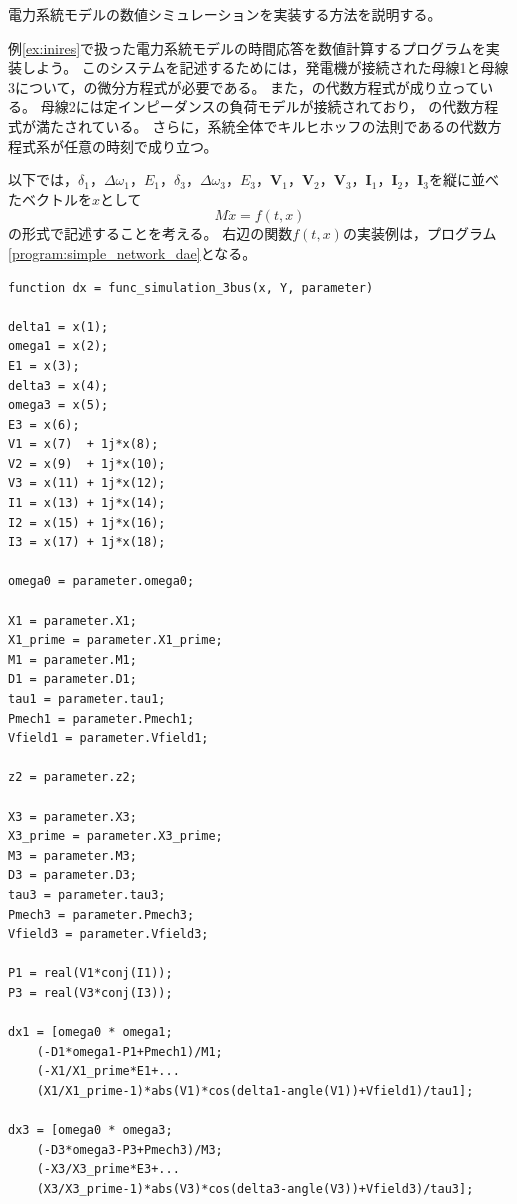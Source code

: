 \documentclass[tombow,dvipdfmx]{corona-a5-1.1}
\begin{document}
電力系統モデルの数値シミュレーションを実装する方法を説明する。

\begin{例}[電力系統のシミュレーションの単純な実装]\label{ex:dae_ex2}
例\ref{ex:inires}で扱った電力系統モデルの時間応答を数値計算するプログラムを実装しよう。
このシステムを記述するためには，発電機が接続された母線1と母線3について，の微分方程式が必要である。
また，の代数方程式が成り立っている。
母線2には定インピーダンスの負荷モデルが接続されており，
の代数方程式が満たされている。
さらに，系統全体でキルヒホッフの法則であるの代数方程式系が任意の時刻で成り立つ。

以下では，$\delta_1$，$\Delta\omega_1$，$E_1$，$\delta_3$，$\Delta\omega_3$，$E_3$，$\bm V_1$，$\bm V_2$，$\bm V_3$，$\bm I_1$，$\bm I_2$，$\bm I_3$を縦に並べたベクトルを$x$として
\[
M\dot{x} = f(t, x)
\]
の形式で記述することを考える。
右辺の関数$f(t, x)$の実装例は，プログラム\ref{program:simple_network_dae}となる。

\smallskip
\begin{PROGRAMA}[count,title={func\_simulation\_3bus.m}]\label{program:simple_network_dae}
\begin{verbatim}
function dx = func_simulation_3bus(x, Y, parameter)

delta1 = x(1);
omega1 = x(2);
E1 = x(3);
delta3 = x(4);
omega3 = x(5);
E3 = x(6);
V1 = x(7)  + 1j*x(8);
V2 = x(9)  + 1j*x(10);
V3 = x(11) + 1j*x(12);
I1 = x(13) + 1j*x(14);
I2 = x(15) + 1j*x(16);
I3 = x(17) + 1j*x(18);

omega0 = parameter.omega0;

X1 = parameter.X1;
X1_prime = parameter.X1_prime;
M1 = parameter.M1;
D1 = parameter.D1;
tau1 = parameter.tau1;
Pmech1 = parameter.Pmech1;
Vfield1 = parameter.Vfield1;

z2 = parameter.z2;

X3 = parameter.X3;
X3_prime = parameter.X3_prime;
M3 = parameter.M3;
D3 = parameter.D3;
tau3 = parameter.tau3;
Pmech3 = parameter.Pmech3;
Vfield3 = parameter.Vfield3;

P1 = real(V1*conj(I1));
P3 = real(V3*conj(I3));

dx1 = [omega0 * omega1;
    (-D1*omega1-P1+Pmech1)/M1;
    (-X1/X1_prime*E1+...
    (X1/X1_prime-1)*abs(V1)*cos(delta1-angle(V1))+Vfield1)/tau1];

dx3 = [omega0 * omega3;
    (-D3*omega3-P3+Pmech3)/M3;
    (-X3/X3_prime*E3+...
    (X3/X3_prime-1)*abs(V3)*cos(delta3-angle(V3))+Vfield3)/tau3];


\end{verbatim}
\end{PROGRAMA}
\end{例}
\end{document}
